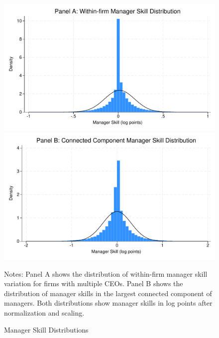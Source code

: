\documentclass[11pt,a4paper]{article}
\begin{document}
\begin{figure}[htbp]
\centering
\begin{minipage}{0.48\textwidth}
\centering
\includegraphics[width=\textwidth]{figure/manager_skill_within.pdf}
\end{minipage}
\hfill
\begin{minipage}{0.48\textwidth}
\centering
\includegraphics[width=\textwidth]{figure/manager_skill_connected.pdf}
\end{minipage}
\caption{Manager Skill Distributions}
\label{fig:manager_skills}
\footnotesize
Notes: Panel A shows the distribution of within-firm manager skill variation for firms with multiple CEOs. Panel B shows the distribution of manager skills in the largest connected component of managers. Both distributions show manager skills in log points after normalization and scaling.
\end{figure}
\end{document}
